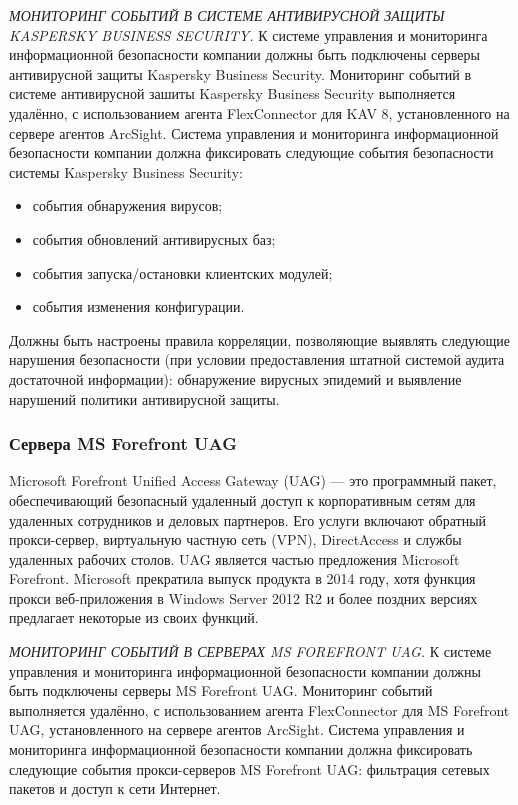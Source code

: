 \newpage
\textit{МОНИТОРИНГ СОБЫТИЙ В СИСТЕМЕ АНТИВИРУСНОЙ ЗАЩИТЫ KASPERSKY BUSINESS SECURITY.}
К системе управления и мониторинга информационной безопасности компании должны быть подключены серверы антивирусной защиты Kaspersky Business Security. Мониторинг событий в системе антивирусной зашиты Kaspersky Business Security выполняется удалённо, с использованием агента FlexConnector для KAV 8, установленного на сервере агентов ArcSight.
Система управления и мониторинга информационной безопасности компании должна фиксировать следующие события безопасности системы Kaspersky Business Security:
\begin{itemize}
    \item события обнаружения вирусов;
    \item события обновлений антивирусных баз;
    \item события запуска/остановки клиентских модулей;
    \item события изменения конфигурации.
\end{itemize}

Должны быть настроены правила корреляции, позволяющие выявлять следующие нарушения безопасности (при условии предоставления штатной системой аудита достаточной информации): обнаружение вирусных эпидемий и выявление нарушений политики антивирусной защиты.

\subsubsection{Сервера MS Forefront UAG}
Microsoft Forefront Unified Access Gateway (UAG) — это программный пакет, обеспечивающий безопасный удаленный доступ к корпоративным сетям для удаленных сотрудников и деловых партнеров. Его услуги включают обратный прокси-сервер, виртуальную частную сеть (VPN), DirectAccess и службы удаленных рабочих столов. UAG является частью предложения Microsoft Forefront. Microsoft прекратила выпуск продукта в 2014 году, хотя функция прокси веб-приложения в Windows Server 2012 R2 и более поздних версиях предлагает некоторые из своих функций.

\textit{МОНИТОРИНГ СОБЫТИЙ В СЕРВЕРАХ MS FOREFRONT UAG.}
К системе управления и мониторинга информационной безопасности компании должны быть подключены серверы MS Forefront UAG. Мониторинг событий выполняется удалённо, с использованием агента FlexConnector для MS Forefront UAG, установленного на сервере агентов ArcSight.
Система управления и мониторинга информационной безопасности компании должна фиксировать следующие события прокси-серверов MS Forefront UAG: фильтрация сетевых пакетов и доступ к сети Интернет.

